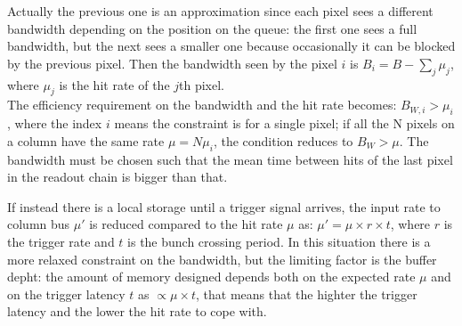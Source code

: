    Actually the previous one is an approximation since each pixel sees a different bandwidth depending on the position on the queue: the first one sees a full bandwidth, but the next sees a smaller one because occasionally it can be blocked by the previous pixel. Then the bandwidth seen by the pixel $i$ is $B_{i} = B - \sum _{j}\mu_{j}$, where $\mu_j$ is the hit rate of the $j$th pixel.\\
   The efficiency requirement on the bandwidth and the hit rate becomes: $B_{W,i} > \mu_{i}$, where the index $i$ means the constraint is for a single pixel; if all the N pixels on a column have the same rate $\mu = N\mu_{i}$, the condition reduces to $B_{W} > \mu$.
   The bandwidth must be chosen such that the mean time between hits of the last pixel in the readout chain is bigger than that.\\

   If instead there is a local storage until a trigger signal arrives, the input rate to column bus $\mu '$ is reduced compared to the hit rate $\mu$ as: $\mu'=\mu \times r \times t$, where $r$ is the trigger rate and $t$ is the bunch crossing period.
   In this situation there is a more relaxed constraint on the bandwidth, but the limiting factor is the buffer depht: the  amount of memory designed depends both on the expected rate $\mu$ and on the trigger latency $t$ as $\propto\mu \times t$, that means that the highter the trigger latency and the lower the hit rate to cope with. 

